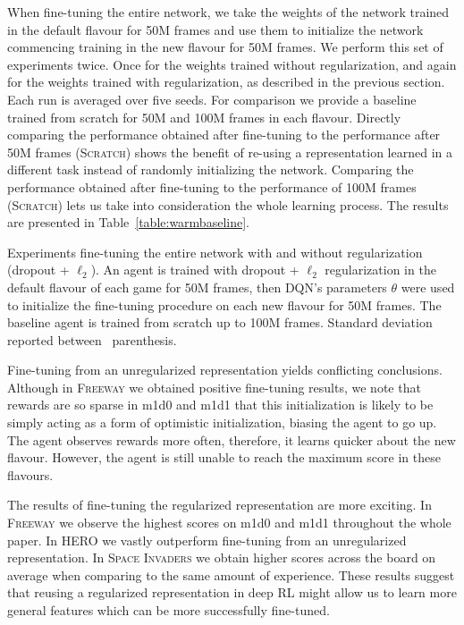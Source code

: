 \documentclass{article}
\begin{document}
When fine-tuning the entire network, we take the weights of the network trained in the default flavour for 50M frames and use them to initialize the network commencing training in the new flavour for 50M frames. We perform this set of experiments twice. Once for the weights trained without regularization, and again for the weights trained with regularization, as described in the previous section. Each run is averaged over five seeds. For comparison we provide a baseline trained from scratch for 50M and 100M frames in each flavour.
Directly comparing the performance obtained after fine-tuning to the performance after 50M frames (\textsc{Scratch}) shows the benefit of re-using a representation learned in a different task instead of randomly initializing the network. Comparing the performance obtained after fine-tuning to the performance of 100M frames (\textsc{Scratch}) lets us take into consideration the whole learning process.
The results are presented in Table~\ref{table:warmbaseline}.


\begin{table}[t]
    \centering
    \resizebox{\textwidth}{!}{
        
    }
    \caption{Experiments fine-tuning the entire network with and without regularization (dropout + $\ell_2$). An agent is trained with dropout + $\ell_2$ regularization in the default flavour of each game for 50M frames, then DQN's parameters $\theta$ were used to initialize the fine-tuning procedure on each new flavour for 50M frames. The baseline agent is trained from scratch up to 100M frames. Standard deviation reported between~ parenthesis.}
    \label{table:warmbaseline}
\end{table}


Fine-tuning from an unregularized representation yields conflicting conclusions.
Although in \textsc{Freeway} we obtained positive fine-tuning results, we note that rewards are so sparse in m1d0 and m1d1 that this initialization is likely to be simply acting as a form of optimistic initialization, biasing the agent to go up. The agent observes rewards more often, therefore, it learns quicker about the new flavour. However, the agent is still unable to reach the maximum score in these flavours.

The results of fine-tuning the regularized representation are more exciting.
In \textsc{Freeway} we observe the highest scores on m1d0 and m1d1 throughout the whole paper. In \textsc{HERO} we vastly outperform fine-tuning from an unregularized representation. In \textsc{Space Invaders} we obtain higher scores across the board on average when comparing to the same amount of experience. These results suggest that reusing a regularized representation in deep RL might allow us to learn more general features which can be more successfully fine-tuned.
\end{document}
